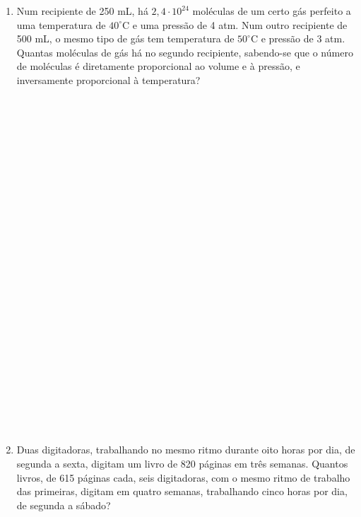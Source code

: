 \documentclass[a4paper,14pt]{article}
\begin{document}
\begin{multicols}{2}
\begin{enumerate}
			\item Num recipiente de 250 mL, há $2,4 \cdot 10^{24}$ moléculas de um certo gás perfeito a uma temperatura de $40^\circ$C e uma pressão de 4 atm. Num outro recipiente de 500 mL, o mesmo tipo de gás tem temperatura de $50^\circ$C e pressão de 3 atm. Quantas moléculas de gás há no segundo recipiente, sabendo-se que o número de moléculas é diretamente proporcional ao volume e à pressão, e inversamente proporcional à temperatura? \\\\\\\\\\\\\\\\\\\\\\\\\\\\\\\\\\\\\\\\\\\\\\\\\\\\
			\item Duas digitadoras, trabalhando no mesmo ritmo durante oito horas por dia, de segunda a sexta, digitam um livro de 820 páginas em três semanas. Quantos livros, de 615 páginas cada, seis digitadoras, com o mesmo ritmo de trabalho das primeiras, digitam em quatro semanas, trabalhando cinco horas por dia, de segunda a sábado? \\\\\\\\\\\\\\\\\\\\\\\\\\\\\\\\\\\\\\\\\\\\\\\\\\\\\\\\\\\\

\end{enumerate}
\end{multicols}
\end{document}
